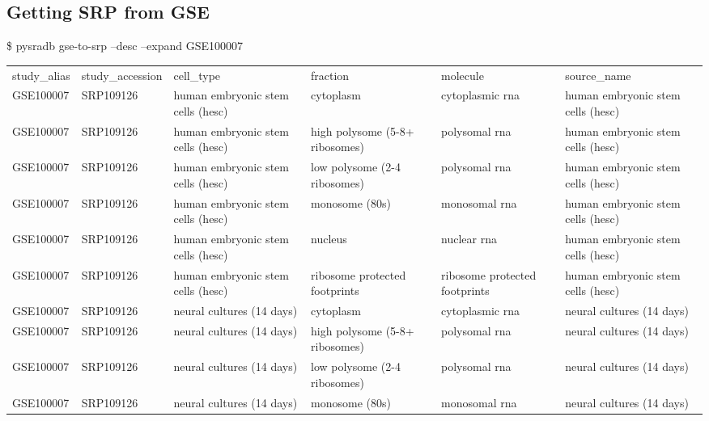 \documentclass[9pt,a4paper]{extarticle}
\newenvironment{allintypewriter}{\ttfamily}{\par}
\begin{document}
\subsection*{Getting SRP from GSE}
\begin{allintypewriter}
\$ pysradb gse-to-srp --desc --expand GSE100007
\begin{table}[H]
    \begin{tabular}{llllll}
study_alias & study_accession & cell_type & fraction & molecule & source_name\\                       GSE100007 &  SRP109126   &    human embryonic stem cells (hesc) & cytoplasm                      & cytoplasmic rna               &  human embryonic stem cells (hesc)\\
GSE100007 &  SRP109126   &    human embryonic stem cells (hesc) & high polysome (5-8+ ribosomes) & polysomal rna                 &  human embryonic stem cells (hesc)\\
GSE100007 &  SRP109126   &    human embryonic stem cells (hesc) & low polysome (2-4 ribosomes)   & polysomal rna                 &  human embryonic stem cells (hesc)\\
GSE100007 &  SRP109126   &    human embryonic stem cells (hesc) & monosome (80s)                 & monosomal rna                 &  human embryonic stem cells (hesc)\\
GSE100007 &  SRP109126   &    human embryonic stem cells (hesc) & nucleus                        & nuclear rna                   &  human embryonic stem cells (hesc)\\
GSE100007 &  SRP109126   &    human embryonic stem cells (hesc) & ribosome protected footprints  & ribosome protected footprints &  human embryonic stem cells (hesc)\\
GSE100007 &  SRP109126   &    neural cultures (14 days)         & cytoplasm                      & cytoplasmic rna               &  neural cultures (14 days)\\
GSE100007 &  SRP109126   &    neural cultures (14 days)         & high polysome (5-8+ ribosomes) & polysomal rna                 &  neural cultures (14 days)\\
GSE100007 &  SRP109126   &    neural cultures (14 days)         & low polysome (2-4 ribosomes)   & polysomal rna                 &  neural cultures (14 days)\\
GSE100007 &  SRP109126   &    neural cultures (14 days)         & monosome (80s)                 & monosomal rna                 &  neural cultures (14 days)\\

\end{tabular}
\end{table}
\end{allintypewriter}
\end{document}
